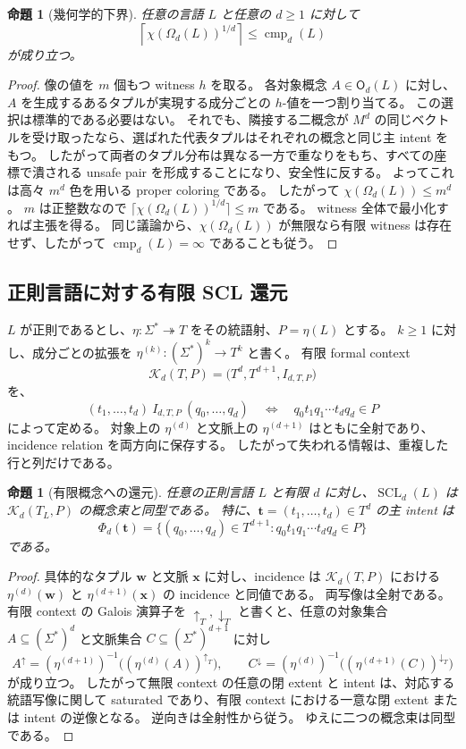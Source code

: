 \documentclass[10pt,a4paper]{ltjsarticle}
\newtheorem{proposition}[theorem]{命題}
\theoremstyle{definition}
\theoremstyle{remark}
\newcommand{\cmp}{\operatorname{cmp}}
\newcommand{\SCL}{\operatorname{SCL}}
\newcommand{\Obj}{\mathsf O}
\newcommand{\Om}{\Omega}
\begin{document}
\begin{proposition}[幾何学的下界]
\label{scl:prop:chromatic-lower}
任意の言語 $L$ と任意の $d\ge1$ に対して
\[
\left\lceil\chi(\Om_d(L))^{1/d}\right\rceil\le \cmp_d(L)
\]
が成り立つ。
\end{proposition}
\begin{proof}
像の値を $m$ 個もつ witness $h$ を取る。
各対象概念 $A\in\Obj_d(L)$ に対し、$A$ を生成するあるタプルが実現する成分ごとの $h$-値を一つ割り当てる。
この選択は標準的である必要はない。
それでも、隣接する二概念が $M^d$ の同じベクトルを受け取ったなら、選ばれた代表タプルはそれぞれの概念と同じ主 intent をもつ。
したがって両者のタプル分布は異なる一方で重なりをもち、すべての座標で潰される unsafe pair を形成することになり、安全性に反する。
よってこれは高々 $m^d$ 色を用いる proper coloring である。
したがって $\chi(\Om_d(L))\le m^d$。
$m$ は正整数なので
$\lceil\chi(\Om_d(L))^{1/d}\rceil\le m$ である。
witness 全体で最小化すれば主張を得る。
同じ議論から、$\chi(\Om_d(L))$ が無限なら有限 witness は存在せず、したがって $\cmp_d(L)=\infty$ であることも従う。
\end{proof}

\subsection{正則言語に対する有限 SCL 還元}

$L$ が正則であるとし、$\eta:\Sigma^*\twoheadrightarrow T$ をその統語射、$P=\eta(L)$ とする。
$k\ge1$ に対し、成分ごとの拡張を
$\eta^{(k)}:(\Sigma^*)^k\to T^k$
と書く。
有限 formal context
\[
\mathcal K_d(T,P)=\bigl(T^d,T^{d+1},I_{d,T,P}\bigr)
\]
を、
\[
(t_1,\ldots,t_d)\ I_{d,T,P}\ (q_0,\ldots,q_d)
\quad\Longleftrightarrow\quad
q_0t_1q_1\cdots t_dq_d\in P
\]
によって定める。
対象上の $\eta^{(d)}$ と文脈上の $\eta^{(d+1)}$ はともに全射であり、incidence relation を両方向に保存する。
したがって失われる情報は、重複した行と列だけである。

\begin{proposition}[有限概念への還元]
\label{scl:prop:finite-reduction}
任意の正則言語 $L$ と有限 $d$ に対し、$\SCL_d(L)$ は $\mathcal K_d(T_L,P)$ の概念束と同型である。
特に、$\mathbf t=(t_1,\ldots,t_d)\in T^d$ の主 intent は
\[
\Phi_d(\mathbf t)
=\{(q_0,\ldots,q_d)\in T^{d+1}:q_0t_1q_1\cdots t_dq_d\in P\}
\]
である。
\end{proposition}
\begin{proof}
具体的なタプル $\mathbf w$ と文脈 $\mathbf x$ に対し、incidence は $\mathcal K_d(T,P)$ における $\eta^{(d)}(\mathbf w)$ と $\eta^{(d+1)}(\mathbf x)$ の incidence と同値である。
両写像は全射である。
有限 context の Galois 演算子を $\uparrow_T,\downarrow_T$ と書くと、任意の対象集合 $A\subseteq(\Sigma^*)^d$ と文脈集合 $C\subseteq(\Sigma^*)^{d+1}$ に対し
\[
A^\uparrow
=(\eta^{(d+1)})^{-1}\!\bigl((\eta^{(d)}(A))^{\uparrow_T}\bigr),
\qquad
C^\downarrow
=(\eta^{(d)})^{-1}\!\bigl((\eta^{(d+1)}(C))^{\downarrow_T}\bigr)
\]
が成り立つ。
したがって無限 context の任意の閉 extent と intent は、対応する統語写像に関して saturated であり、有限 context における一意な閉 extent または intent の逆像となる。
逆向きは全射性から従う。
ゆえに二つの概念束は同型である。
\end{proof}
\end{document}
